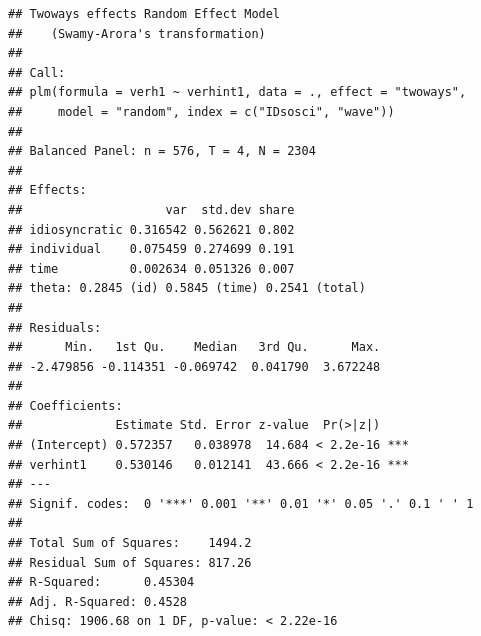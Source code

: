 \documentclass[
]{book}
\newenvironment{Shaded}{\begin{snugshade}}{\end{snugshade}}
\newcommand{\CommentTok}[1]{\textcolor[rgb]{0.56,0.35,0.01}{\textit{#1}}}
\newcommand{\DataTypeTok}[1]{\textcolor[rgb]{0.13,0.29,0.53}{#1}}
\newcommand{\KeywordTok}[1]{\textcolor[rgb]{0.13,0.29,0.53}{\textbf{#1}}}
\newcommand{\NormalTok}[1]{#1}
\newcommand{\OperatorTok}[1]{\textcolor[rgb]{0.81,0.36,0.00}{\textbf{#1}}}
\newcommand{\StringTok}[1]{\textcolor[rgb]{0.31,0.60,0.02}{#1}}
\begin{document}
\begin{Shaded}
\end{Shaded}

\begin{verbatim}
## Twoways effects Random Effect Model 
##    (Swamy-Arora's transformation)
## 
## Call:
## plm(formula = verh1 ~ verhint1, data = ., effect = "twoways", 
##     model = "random", index = c("IDsosci", "wave"))
## 
## Balanced Panel: n = 576, T = 4, N = 2304
## 
## Effects:
##                    var  std.dev share
## idiosyncratic 0.316542 0.562621 0.802
## individual    0.075459 0.274699 0.191
## time          0.002634 0.051326 0.007
## theta: 0.2845 (id) 0.5845 (time) 0.2541 (total)
## 
## Residuals:
##      Min.   1st Qu.    Median   3rd Qu.      Max. 
## -2.479856 -0.114351 -0.069742  0.041790  3.672248 
## 
## Coefficients:
##             Estimate Std. Error z-value  Pr(>|z|)    
## (Intercept) 0.572357   0.038978  14.684 < 2.2e-16 ***
## verhint1    0.530146   0.012141  43.666 < 2.2e-16 ***
## ---
## Signif. codes:  0 '***' 0.001 '**' 0.01 '*' 0.05 '.' 0.1 ' ' 1
## 
## Total Sum of Squares:    1494.2
## Residual Sum of Squares: 817.26
## R-Squared:      0.45304
## Adj. R-Squared: 0.4528
## Chisq: 1906.68 on 1 DF, p-value: < 2.22e-16
\end{verbatim}

\begin{Shaded}
\end{Shaded}
\end{document}
